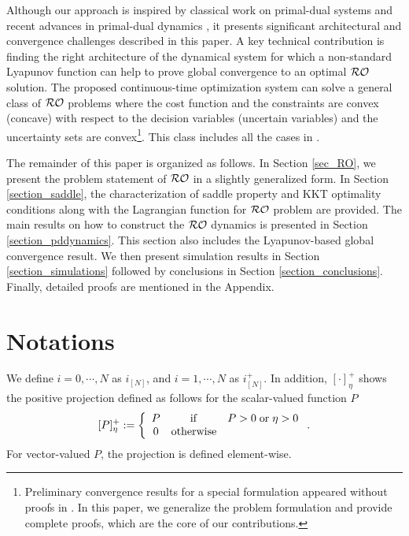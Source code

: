 \documentclass[journal,twoside,web]{ieeecolor}
\begin{document}
{\color{blue} Although our approach is inspired by classical work on primal-dual systems \cite{arrow1958,feijer2010} and recent advances in primal-dual dynamics \cite{timerescaling2023,pddamping2023,meanfield2023}, it presents significant architectural and convergence challenges described in this paper.} A key technical contribution is finding the right architecture of the dynamical system for which a non-standard Lyapunov function can help to prove global convergence to an optimal ${\cal RO}$ solution. The proposed continuous-time optimization system can solve a general class of ${\cal RO}$ problems where the cost function and the constraints are convex (concave) with respect to the decision variables (uncertain variables) and the uncertainty sets are convex\footnote{Preliminary convergence results for a special formulation appeared without proofs in \cite{ebrahimi2019continuous}. In this paper, we generalize the problem formulation and provide complete proofs, which are the core of our contributions.}. This class includes all the cases in \cite[~Table 1]{gorissen20152}.


The remainder of this paper is organized as follows. In Section \ref{sec_RO}, we present the problem statement of ${\cal RO}$ in a slightly generalized form. In Section \ref{section_saddle}, the characterization of saddle property and KKT optimality conditions along with the Lagrangian function for ${\cal RO}$ problem are provided. The main results on how to construct the ${\cal RO}$ dynamics is presented in Section \ref{section_pddynamics}. This section also includes the Lyapunov-based global convergence result. We then present simulation results in Section \ref{section_simulations} followed by conclusions in Section \ref{section_conclusions}.
Finally, detailed proofs are mentioned in the Appendix.

\section{Notations}\label{notations}

We define $i=0,\cdots,N$ as $i_{[N]}$, and $i=1,\cdots,N$ as $i^+_{[N]}$. In addition, $\left[\cdot\right]_\eta^+$ shows the positive projection defined as follows for the scalar-valued function $P$
\begin{align} \label{proj}
[P]_\eta^+:=\left\{\begin{array}{ccl}P&{\rm if}& P>0 \;{\rm or} \;\eta>0\\
0&{\rm otherwise}
\end{array}\right..
\end{align}
For vector-valued $P$, the projection is defined element-wise.
\end{document}
